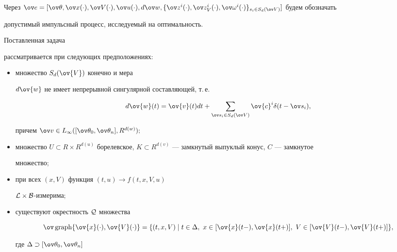Через $\ov e=


[\ov \theta, \ov


x(\cdot),\ov V(\cdot),\ov u(\cdot),d\ov w,


\{\ov z^i(\cdot),\ov z_V^i(\cdot),\ov\omega^i(\cdot)\}_{s_i\in


S_d(\ov V)}]$ будем обозначать


допустимый импульсный процесс, исследуемый на оптимальность.





Поставленная задача


рассматривается при следующих предположениях:


\begin{itemize}


\item[(B1)] множество $S_d(\ov{V})$ конечно и мера


$d\ov{ w}$ не имеет непрерывной сингулярной составляющей, т.\,е.


$$


d\ov{ w}(t)=\ov{v}(t)dt+\sum_{\ov s_i \in


{S}_d(\ov V)}\ov{c}^i\delta(t-\ov s_i),


$$


причем $\ov v\in


L_\infty ([\ov\theta_0,\ov\theta_n],R^{d(w)});$


\item[(B2)] множество $U\subset R\times R^{d(u)}$ борелевское, $K


\subset R^{d(v)}$ --- замкнутый выпуклый конус, $C$ --- замкнутое


множество;


\item[(B3)] при всех $(x,V)$ функция $(t,u) \rightarrow f(t,x,V,u)$


\; ${\cal L}\times {\cal B}$-измерима;


\item[(B4)] существуют окрестность ${\cal Q}$ множества


$$


\ov\graph\{\ov{x}(\cdot),\ov{V}(\cdot)\}


=\{(t,x,V)\mid


t \in \Delta, \ x \in [\ov{x}(t-),\ov{x}(t+)],\ V \in


[\ov{V}(t-),\ov{V}(t+)]\},


$$


где $\Delta\supset [\ov\theta_0,\ov\theta_n]$



\end{itemize}
